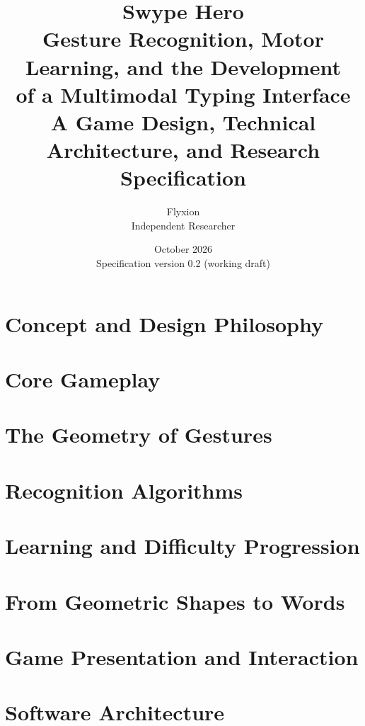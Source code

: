 \documentclass[11pt,twoside,openany]{book}
\title{\textbf{Swype Hero}\\[0.6em]\Large Gesture Recognition, Motor Learning, and the Development\\of a Multimodal Typing Interface\\[0.8em]\large A Game Design, Technical Architecture, and Research Specification}
\author{Flyxion\\ \small Independent Researcher}
\date{October 2026\\ \small Specification version 0.2 (working draft)}
\theoremstyle{definition}
\theoremstyle{plain}
\theoremstyle{remark}
\begin{document}
\frontmatter
\maketitle



\tableofcontents

\mainmatter

\part{Concept and Design Philosophy}\label{part:concept}


\part{Core Gameplay}\label{part:gameplay}


\part{The Geometry of Gestures}\label{part:geometry}


\part{Recognition Algorithms}\label{part:recognition}


\part{Learning and Difficulty Progression}\label{part:learning}


\part{From Geometric Shapes to Words}\label{part:words}


\part{Game Presentation and Interaction}\label{part:presentation}


\part{Software Architecture}\label{part:architecture}

\end{document}
